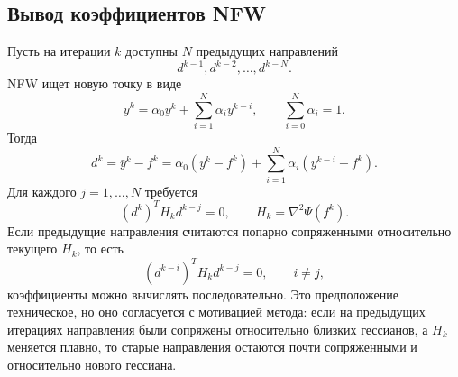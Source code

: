 \subsection{Вывод коэффициентов NFW}

Пусть на итерации $k$ доступны $N$ предыдущих направлений
\[
    d^{k-1},d^{k-2},\ldots,d^{k-N}.
\]
NFW ищет новую точку в виде
\[
    \bar y^k=\alpha_0y^k+\sum_{i=1}^{N}\alpha_i y^{k-i},
    \qquad
    \sum_{i=0}^{N}\alpha_i=1.
\]
Тогда
\[
    d^k=\bar y^k-f^k
    =
    \alpha_0(y^k-f^k)
    +
    \sum_{i=1}^{N}\alpha_i(y^{k-i}-f^k).
\]
Для каждого $j=1,\ldots,N$ требуется
\[
    (d^k)^T H_k d^{k-j}=0,
    \qquad
    H_k=\nabla^2\Psi(f^k).
\]
Если предыдущие направления считаются попарно сопряженными относительно текущего $H_k$,
то есть
\[
    (d^{k-i})^T H_k d^{k-j}=0,\qquad i\neq j,
\]
коэффициенты можно вычислять последовательно.
Это предположение техническое, но оно согласуется с мотивацией метода:
если на предыдущих итерациях направления были сопряжены относительно близких гессианов,
а $H_k$ меняется плавно, то старые направления остаются почти сопряженными и относительно
нового гессиана.

